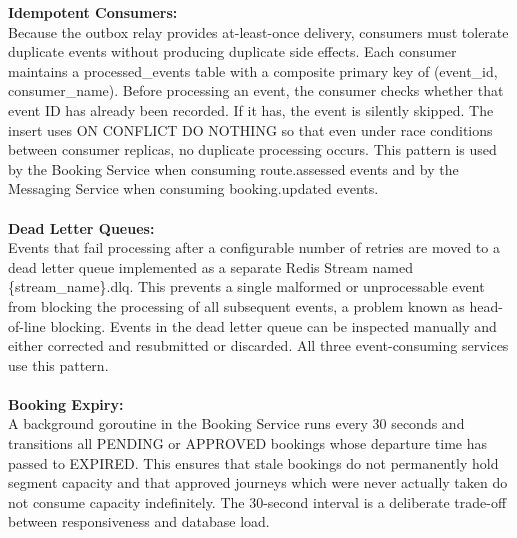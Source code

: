 \documentclass{article}
\begin{document}
\textbf{Idempotent Consumers:}\\
Because the outbox relay provides at-least-once delivery, consumers must tolerate duplicate events without producing duplicate side effects. Each consumer maintains a processed_events table with a composite primary key of (event_id, consumer_name). Before processing an event, the consumer checks whether that event ID has already been recorded. If it has, the event is silently skipped. The insert uses ON CONFLICT DO NOTHING so that even under race conditions between consumer replicas, no duplicate processing occurs. This pattern is used by the Booking Service when consuming route.assessed events and by the Messaging Service when consuming booking.updated events.\\\\
\textbf{Dead Letter Queues:}\\
Events that fail processing after a configurable number of retries are moved to a dead letter queue implemented as a separate Redis Stream named \{stream_name\}.dlq. This prevents a single malformed or unprocessable event from blocking the processing of all subsequent events, a problem known as head-of-line blocking. Events in the dead letter queue can be inspected manually and either corrected and resubmitted or discarded. All three event-consuming services use this pattern.\\\\
\textbf{Booking Expiry:}\\
A background goroutine in the Booking Service runs every 30 seconds and transitions all PENDING or APPROVED bookings whose departure time has passed to EXPIRED. This ensures that stale bookings do not permanently hold segment capacity and that approved journeys which were never actually taken do not consume capacity indefinitely. The 30-second interval is a deliberate trade-off between responsiveness and database load.
\end{document}
